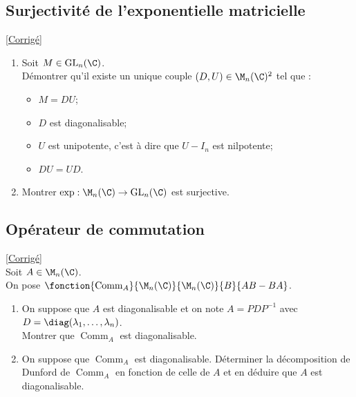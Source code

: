 \documentclass[8pt]{book}
\begin{document}
\subsection{Surjectivité de l'exponentielle matricielle }
\label{Surjectivité de l'exponentielle matricielle}
\textcolor{blue}{\hyperref[Surjectivité de l'exponentielle matricielle corrigé]{[Corrigé]}}\\
\begin{enumerate}[leftmargin=*]
	\item Soit $M\in \text{GL}_n(\C)$.\\
	Démontrer qu'il existe un unique couple $(D,U)\in \M_n(\C)^2$ tel que :
	\begin{itemize}
		\item $M=DU$;
		\item $D$ est diagonalisable;
		\item $U$ est unipotente, c'est à dire que $U-I_n$ est nilpotente;
		\item $DU=UD$.
	\end{itemize}
	\item Montrer $\exp: \M_n(\C)\to \text{GL}_n(\C)$ est surjective.
\end{enumerate}

\subsection{Opérateur de commutation }
\label{Opérateur de commutation}
\textcolor{blue}{\hyperref[Opérateur de commutation corrigé]{[Corrigé]}}\\
Soit $A\in \M_n(\C)$.\\
On pose $\fonction{\operatorname{Comm}_A}{\M_n(\C)}{\M_n(\C)}{B}{AB-BA}$.
\begin{enumerate}
	\item On suppose que $A$ est diagonalisable et on note $A=PDP^{-1}$ avec $D=\diag(\lambda_1,\dots,\lambda_n)$.\\
	Montrer que $\operatorname{Comm}_A$ est diagonalisable.
	\item On suppose que $\operatorname{Comm}_A$ est diagonalisable. Déterminer la décomposition de Dunford de $\operatorname{Comm}_A$ en fonction de celle de $A$ et en déduire que $A$ est diagonalisable.
\end{enumerate}
\end{document}
